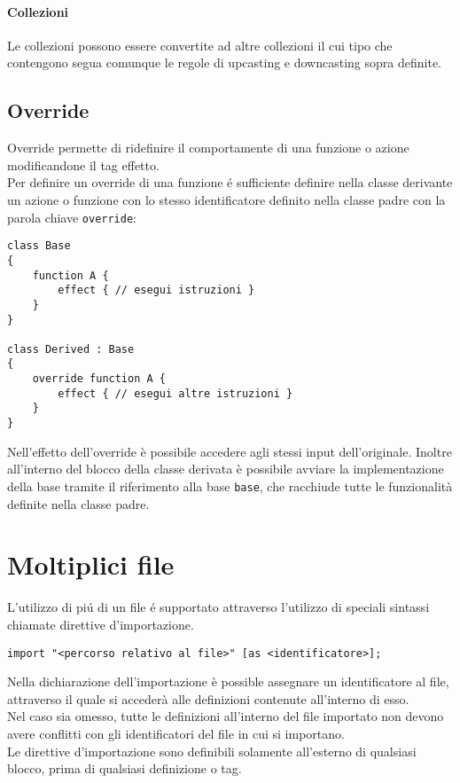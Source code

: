 \paragraph{Collezioni}
Le collezioni possono essere convertite ad altre collezioni il cui tipo che contengono segua 
comunque le regole di upcasting e downcasting sopra definite. 

\subsection{Override}
Override permette di ridefinire il comportamente di una funzione o azione modificandone
il tag effetto. \\ 
Per definire un override di una funzione é sufficiente definire nella classe derivante
un azione o funzione con lo stesso identificatore definito nella classe padre con la 
parola chiave \lstinline|override|:
\begin{lstlisting}
class Base 
{
    function A { 
        effect { // esegui istruzioni } 
    }
}

class Derived : Base
{
    override function A { 
        effect { // esegui altre istruzioni }
    }
}
\end{lstlisting}
Nell'effetto dell'override è possibile accedere agli stessi input dell'originale. 
Inoltre all'interno del blocco della classe derivata è possibile avviare la implementazione 
della base tramite il riferimento alla base \lstinline|base|, che racchiude
tutte le funzionalità definite nella classe padre. \\

\section{Moltiplici file} \label{MultipleFiles}
L'utilizzo di piú di un file é supportato attraverso l'utilizzo di speciali sintassi
chiamate direttive d'importazione. 
\begin{lstlisting}
import "<percorso relativo al file>" [as <identificatore>];
\end{lstlisting}
Nella dichiarazione dell'importazione è possible assegnare un identificatore al file, 
attraverso il quale si accederà alle definizioni contenute all'interno di esso. \\
Nel caso sia omesso, tutte le definizioni all'interno del file importato non devono avere
conflitti con gli identificatori del file in cui si importano. \\
Le direttive d'importazione sono definibili solamente all'esterno di qualsiasi blocco,
prima di qualsiasi definizione o tag. 

